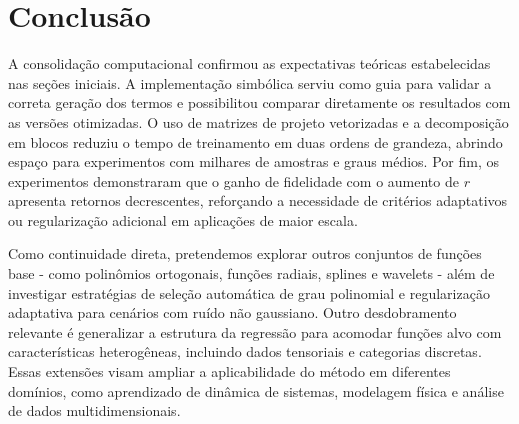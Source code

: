 \section{Conclusão}

A consolidação computacional confirmou as expectativas teóricas estabelecidas
nas seções iniciais. A implementação simbólica serviu como guia para validar
a correta geração dos termos e possibilitou comparar diretamente os resultados
com as versões otimizadas. O uso de matrizes de projeto vetorizadas e a
decomposição em blocos reduziu o tempo de treinamento em duas ordens de
grandeza, abrindo espaço para experimentos com milhares de amostras e graus
médios. Por fim, os experimentos demonstraram que o ganho de fidelidade com o
aumento de $r$ apresenta retornos decrescentes, reforçando a necessidade de
critérios adaptativos ou regularização adicional em aplicações de maior escala.

Como continuidade direta, pretendemos explorar outros conjuntos de funções base
- como polinômios ortogonais, funções radiais, splines e wavelets - além de
investigar estratégias de seleção automática de grau polinomial e
regularização adaptativa para cenários com ruído não gaussiano. Outro
desdobramento relevante é generalizar a estrutura da regressão para acomodar
funções alvo com características heterogêneas, incluindo dados tensoriais e
categorias discretas. Essas extensões visam ampliar a aplicabilidade do método
em diferentes domínios, como aprendizado de dinâmica de sistemas, modelagem
física e análise de dados multidimensionais.
